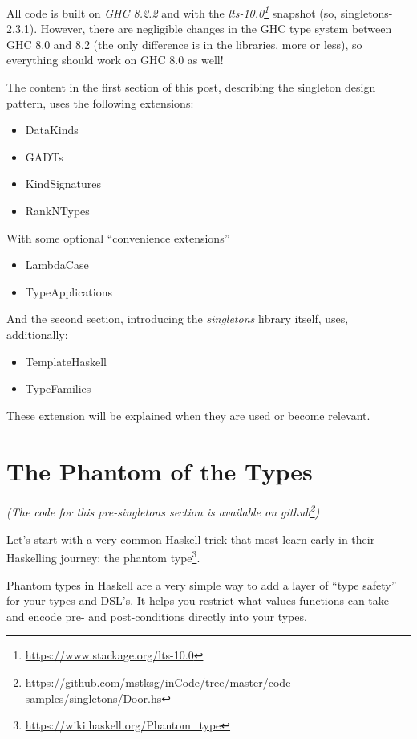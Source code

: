 \documentclass[]{article}
\renewcommand{\href}[2]{#2\footnote{\url{#1}}}
\begin{document}
All code is built on \emph{GHC 8.2.2} and with the
\emph{\href{https://www.stackage.org/lts-10.0}{lts-10.0}} snapshot (so,
singletons-2.3.1). However, there are negligible changes in the GHC type system
between GHC 8.0 and 8.2 (the only difference is in the libraries, more or less),
so everything should work on GHC 8.0 as well!

The content in the first section of this post, describing the singleton design
pattern, uses the following extensions:

\begin{itemize}
\tightlist
\item
  DataKinds
\item
  GADTs
\item
  KindSignatures
\item
  RankNTypes
\end{itemize}

With some optional ``convenience extensions''

\begin{itemize}
\tightlist
\item
  LambdaCase
\item
  TypeApplications
\end{itemize}

And the second section, introducing the \emph{singletons} library itself, uses,
additionally:

\begin{itemize}
\tightlist
\item
  TemplateHaskell
\item
  TypeFamilies
\end{itemize}

These extension will be explained when they are used or become relevant.

\hypertarget{the-phantom-of-the-types}{%
\section{The Phantom of the Types}\label{the-phantom-of-the-types}}

\emph{(The code for this pre-singletons section is available
\href{https://github.com/mstksg/inCode/tree/master/code-samples/singletons/Door.hs}{on
github})}

Let's start with a very common Haskell trick that most learn early in their
Haskelling journey: the \href{https://wiki.haskell.org/Phantom_type}{phantom
type}.

Phantom types in Haskell are a very simple way to add a layer of ``type safety''
for your types and DSL's. It helps you restrict what values functions can take
and encode pre- and post-conditions directly into your types.
\end{document}
